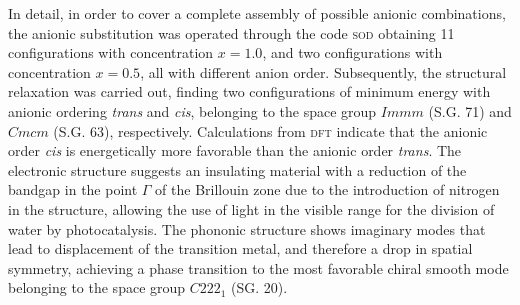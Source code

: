 {\begin{description}
  In detail, in order to cover a complete assembly of possible anionic combinations, the anionic substitution was operated through the code \textsc{sod} obtaining 11 configurations with concentration $x=1.0$, and two configurations with concentration $x=0.5$, all with different anion order.
  Subsequently, the structural relaxation was carried out, finding two configurations of minimum energy with anionic ordering \emph{trans} and \emph{cis}, belonging to the space group $Immm$ (S.G. 71) and $Cmcm$ (S.G. 63), respectively.
  Calculations from \textsc{dft} indicate that the anionic order \emph{cis} is energetically more favorable than the anionic order \emph{trans}.
  The electronic structure suggests an insulating material with a reduction of the bandgap in the point $\Gamma$ of the Brillouin zone due to the introduction of nitrogen in the structure, allowing the use of light in the visible range for the division of water by photocatalysis.
  The phononic structure shows imaginary modes that lead to displacement of the transition metal, and therefore a drop in spatial symmetry, achieving a phase transition to the most favorable chiral smooth mode belonging to the space group $C222_ {1}$ (SG. 20). 
\end{description}}\normalsize
